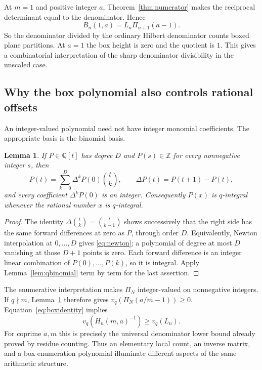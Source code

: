 \documentclass[11pt,a4paper]{article}
\numberwithin{equation}{section}
\newtheorem{lemma}[theorem]{Lemma}
\theoremstyle{definition}
\theoremstyle{remark}
\newcommand{\Z}{\mathbb{Z}}
\newcommand{\Q}{\mathbb{Q}}
\newcommand{\PP}{\Pi}
\begin{document}
At $m=1$ and positive integer $a$, Theorem~\ref{thm:numerator} makes the reciprocal determinant equal to the denominator. Hence
\begin{equation}\label{eq:integeroffsetbox}
 B_n(1,a)=L_n\PP_{n+1}(a-1).
\end{equation}
So the denominator divided by the ordinary Hilbert denominator counts boxed plane partitions. At $a=1$ the box height is zero and the quotient is $1$. This gives a combinatorial interpretation of the sharp denominator divisibility in the unscaled case.

\subsection{Why the box polynomial also controls rational offsets}
An integer-valued polynomial need not have integer monomial coefficients. The appropriate basis is the binomial basis.

\begin{lemma}\label{lem:intpoly}
If $P\in\Q[t]$ has degree $D$ and $P(s)\in\Z$ for every nonnegative integer $s$, then
\begin{equation}\label{eq:newton}
 P(t)=\sum_{k=0}^D\Delta^kP(0)\binom{t}{k},
 \qquad \Delta P(t)=P(t+1)-P(t),
\end{equation}
and every coefficient $\Delta^kP(0)$ is an integer. Consequently $P(x)$ is $q$-integral whenever the rational number $x$ is $q$-integral.
\end{lemma}
\begin{proof}
The identity $\Delta\binom{t}{k}=\binom{t}{k-1}$ shows successively that the right side has the same forward differences at zero as $P$, through order $D$. Equivalently, Newton interpolation at $0,\ldots,D$ gives \eqref{eq:newton}; a polynomial of degree at most $D$ vanishing at those $D+1$ points is zero. Each forward difference is an integer linear combination of $P(0),\ldots,P(k)$, so it is integral. Apply Lemma~\ref{lem:qbinomial} term by term for the last assertion.
\end{proof}

The enumerative interpretation makes $\PP_N$ integer-valued on nonnegative integers. If $q\nmid m$, Lemma~\ref{lem:intpoly} therefore gives
$v_q(\PP_N(a/m-1))\geq0$. Equation~\eqref{eq:boxidentity} implies
\[
 v_q(H_n(m,a)^{-1})\geq v_q(L_n).
\]
For coprime $a,m$ this is precisely the universal denominator lower bound already proved by residue counting. Thus an elementary local count, an inverse matrix, and a box-enumeration polynomial illuminate different aspects of the same arithmetic structure.
\end{document}
